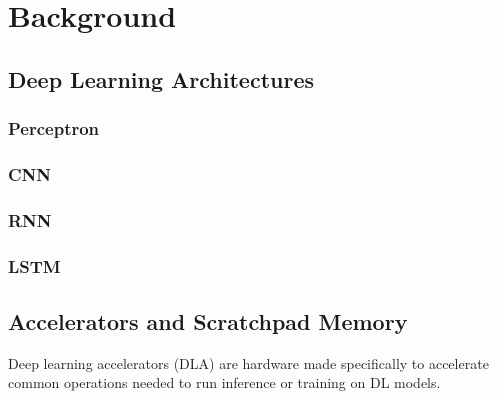 
\chapter{Background} %

\label{Chapter1} %


\section{Deep Learning Architectures}

\subsection{Perceptron}

\subsection{CNN}


\subsection{RNN}



\subsection{LSTM}

\section{Accelerators and Scratchpad Memory}
Deep learning accelerators (DLA) are hardware made specifically to accelerate
common operations needed to run inference or training on DL models. 

